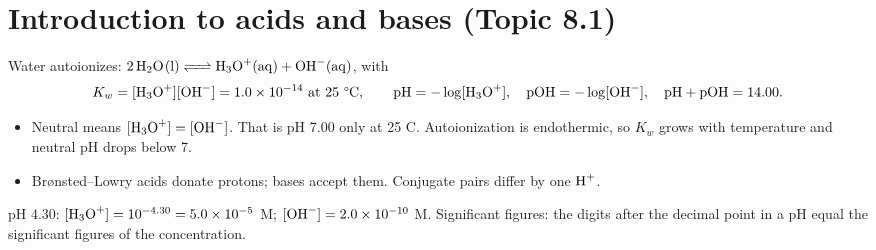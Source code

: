 \documentclass[11pt]{article}
\begin{document}
\titleblock
\begin{abstract}
This guide covers all of Unit 8, Acids and Bases, in twelve sections: one for each of Topics 8.1--8.11 in course order (Topic 8.11, pH and solubility, joined this unit in the Fall 2024 course framework), plus a final section on lab skills and free-response technique. Each section gives the definitions, equations and particle-level reasoning the topic needs, at least one worked example, the phrasing that earns free-response points and the mistakes that cost them. The worked examples use their own acids and numbers, so none of them give away an item in \emph{Unit 8 Practice Set A} or \emph{Unit 8 Practice Set B}. Plan on about 90 minutes for a full read with a calculator out.
\end{abstract}

\section{Introduction to acids and bases (Topic 8.1)}\label{t:8.1}
Water autoionizes: $\ce{2H2O(l) <=> H3O+(aq) + OH-(aq)}$, with
\[ K_w = [\ce{H3O+}][\ce{OH-}] = 1.0\times10^{-14} \text{ at 25 \textdegree C}, \qquad \text{pH} = -\log[\ce{H3O+}], \quad \text{pOH} = -\log[\ce{OH-}], \quad \text{pH} + \text{pOH} = 14.00. \]
\begin{itemize}
\item Neutral means $[\ce{H3O+}] = [\ce{OH-}]$. That is pH 7.00 only at 25 \textdegree C. Autoionization is endothermic, so $K_w$ grows with temperature and neutral pH drops below 7.
\item Brønsted--Lowry acids donate protons; bases accept them. Conjugate pairs differ by one $\ce{H+}$.
\end{itemize}
 pH 4.30: $[\ce{H3O+}] = 10^{-4.30} = 5.0\times10^{-5}$ M; $[\ce{OH-}] = 2.0\times10^{-10}$ M. Significant figures: the digits after the decimal point in a pH equal the significant figures of the concentration.
\end{document}
